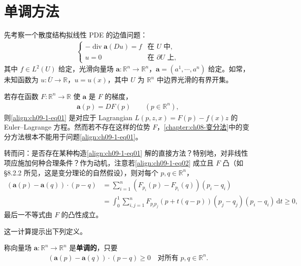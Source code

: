 \documentclass[../../main.tex]{subfiles}
\begin{document}
\section{单调方法}\label{section:ch04-变换方法}

先考察一个散度结构拟线性 PDE 的边值问题：
\begin{align}
\begin{cases}
-\operatorname{div}\mathbf{a}(Du)=f&\text{在 }U\text{ 中},\\
u=0&\text{在 }\partial U\text{ 上},
\end{cases}\label{align:ch09-1-eq01}
\end{align}
其中 $f\in L^2(U)$ 给定，光滑向量场 $\mathbf{a}:\mathbb{R}^n\to\mathbb{R}^n$，$\mathbf{a}=(a^1,\cdots,a^n)$ 给定。如常，未知函数为 $u:\overline{U}\to\mathbb{R}$，$u=u(x)$，其中 $U$ 为 $\mathbb{R}^n$ 中边界光滑的有界开集。

若存在函数 $F:\mathbb{R}^n\to\mathbb{R}$ 使 $\mathbf{a}$ 是 $F$ 的梯度，
\begin{align}
\mathbf{a}(p)=DF(p)\qquad (p\in\mathbb{R}^n),\label{align:ch09-1-eq02}
\end{align}
则\eqref{align:ch09-1-eq01} 是对应于 Lagrangian $L(p,z,x)=F(p)-f(x)z$ 的 Euler--Lagrange 方程。然而若不存在这样的位势 $F$，\cref{chapter:ch08-变分法}中的变分方法根本不能用于问题\eqref{align:ch09-1-eq01}。

转而问：是否存在某种构造\eqref{align:ch09-1-eq01} 解的直接方法？特别地，对非线性项应施加何种合理条件？作为动机，注意若\eqref{align:ch09-1-eq02} 成立且 $F$ 凸（如 \S8.2.2 所见，这是变分理论的自然假设），则对每个 $p,q\in\mathbb{R}^n$，
\begin{align*}
(\mathbf{a}(p)-\mathbf{a}(q))\cdot(p-q)&=\sum_{i=1}^n(F_{p_i}(p)-F_{p_i}(q))(p_i-q_i)\\
&=\int_0^1\sum_{i,j=1}^n F_{p_ip_j}(p+t(q-p))(p_j-q_j)(p_i-q_i)\,\mathrm{d}t\geqslant 0,
\end{align*}
最后一不等式由 $F$ 的凸性成立。

这一计算提示出下列定义。

\begin{definition}\label{definition:ch09-1-单调向量场}
称向量场 $\mathbf{a}:\mathbb{R}^n\to\mathbb{R}^n$ 是\textbf{单调的}，只要
\begin{align}
(\mathbf{a}(p)-\mathbf{a}(q))\cdot(p-q)\geqslant 0\quad\text{对所有 }p,q\in\mathbb{R}^n.\label{align:ch09-1-eq03}
\end{align}
\end{definition}
\end{document}
